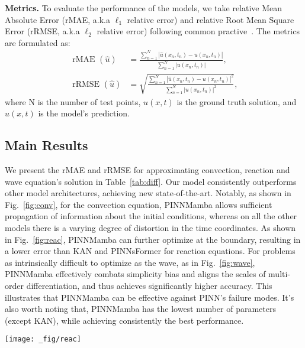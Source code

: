 \textbf{Metrics.} To evaluate the performance of the models, we take relative Mean Absolute Error (rMAE, a.k.a  $\ell_1$ relative error) and relative Root Mean Square Error (rRMSE, a.k.a $\ell_2$ relative error) following common practive~\cite{zhao2024pinnsformer,wu2024ropinn}. The metrics are formulated as:
\begin{align}
\text { rMAE }(\hat u)&=\frac{\sum_{n=1}^N\left|\hat{u}\left(x_n, t_n\right)-u\left(x_n, t_n\right)\right|}{\sum_{n=1}^{N}\left|u\left(x_n, t_n\right)\right|}, \\
\text { rRMSE }(\hat u)&=\sqrt{\frac{\sum_{n=1}^N\left|\hat{u}\left(x_n, t_n\right)-u\left(x_n, t_n\right)\right|^2}{\sum_{n=1}^N\left|u\left(x_n, t_n\right)\right|^2}},
\end{align}
where N is the number of test points, $u(x,t)$ is the ground truth solution, and $\hat u(x,t)$ is the model's prediction.

\vspace{-2mm}

\subsection{Main Results}
\vspace{-1mm}
We present the rMAE and rRMSE for approximating convection, reaction and wave equation's solution in Table~\ref{tab:diff}. Our model consistently outperforms other model architectures, achieving new state-of-the-art.
Notably, as shown in Fig.~\ref{fig:conv}, for the convection equation, PINNMamba allows sufficient propagation of information about the initial conditions, whereas on all the other models there is a varying degree of distortion in the time coordinates.
    As shown in Fig.~\ref{fig:reac}, PINNMamba can further optimize at the boundary, resulting in a lower error than KAN and PINNsFormer for reaction equations. For problems as intrinsically difficult to optimize as the wave, as in Fig.~\ref{fig:wave}, PINNMamba effectively combats simplicity bias and aligns the scales of multi-order differentiation, and thus achieves significantly higher accuracy. This illustrates that PINNMamba can be effective against PINN's failure modes. It's also worth noting that, PINNMamba has the lowest number of parameters (except KAN), while achieving consistently the best performance.



\begin{figure*}[t!]
    \centering
    \texttt{[image: \_fig/reac]}
    \vspace{-8mm}
    \caption{The ground truth solution, prediction (top), and absolute error (bottom) on reaction equations.}
    \label{fig:reac}
    \vspace{-5mm}
\end{figure*}


